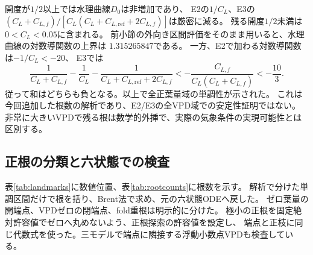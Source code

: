\documentclass[a4paper,11pt]{ltjsarticle}
\begin{document}
開度が$1/2$以上では水理曲線$D_0$は非増加であり、
E2の$1/C_L$、E3の$(C_L+C_{L,f})/
[C_L(C_L+C_{L,\mathrm{ref}}+2C_{L,f})]$は厳密に減る。
残る開度$1/2$未満は$0<C_L<0.05$に含まれる。
前小節の外向き区間評価をそのまま用いると、水理曲線の対数導関数の上界は
$1.315265847$である。
一方、E2で加わる対数導関数は$-1/C_L<-20$、
E3では
\begin{equation}
 \frac{1}{C_L+C_{L,f}}-\frac{1}{C_L}
 -\frac{1}{C_L+C_{L,\mathrm{ref}}+2C_{L,f}}
 <-\frac{C_{L,f}}{C_L(C_L+C_{L,f})}<-\frac{10}{3}.
\end{equation}
従って和はどちらも負となる。以上で全正葉量域の単調性が示された。
これは今回追加した根数の解析であり、E2/E3の全VPD域での安定性証明ではない。
非常に大きいVPDで残る根は数学的外挿で、実際の気象条件の実現可能性とは区別する。

\subsection{正根の分類と六状態での検査}
表\ref{tab:landmarks}に数値位置、表\ref{tab:rootcounts}に根数を示す。
解析で分けた単調区間だけで根を括り、Brent法で求め、元の六状態ODEへ戻した。
ゼロ葉量の開端点、VPDゼロの閉端点、fold重根は明示的に分けた。
極小の正根を固定絶対許容値でゼロへ丸めないよう、正根探索の許容値を設定し、
端点と正枝に同じ代数式を使った。三モデルで端点に隣接する浮動小数点VPDも検査している。
\end{document}
